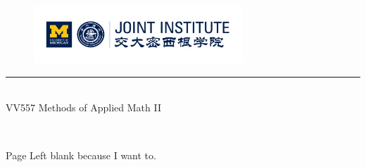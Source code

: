 \documentclass{article}
\numberwithin{equation}{section}
\newcommand{\<}{\langle}
\begin{document}
\setmainfont{Cormorant Upright}
\renewcommand\arraystretch{1.5}


\thispagestyle{empty}

\begin{center}
\begin{large}
\begin{figure}[!htbp]
\centering
\includegraphics[width=0.7\textwidth]{Logo2}
\end{figure}
\hrule
\vspace*{0.25cm}
 \\
\Large  VV557 Methods of Applied Math II\\
\end{large}
\hrulefill

\vspace*{2cm}
\begin{Large}
 \\
\end{Large}
\vspace*{2cm}
\begin{Large}

\end{Large}
\vspace*{0.5cm}
\begin{large}
\end{large}
\end{center}
\newpage

\begin{center}
\vspace*{6em}
Page Left blank because I want to.
\end{center}

\newpage
\setmainfont{Optima}
\setmonofont{Optima}
\setsansfont{Optima}
\setcounter{page}{1}
\normalsize
\end{document}
